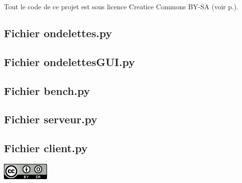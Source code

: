 \documentclass{article}
\begin{document}
Tout le code de ce projet est sous licence Creatice Commons BY-SA (voir p.\pageref{links}).


\subsection{Fichier ondelettes.py}


\subsection{Fichier ondelettesGUI.py}


\subsection{Fichier bench.py}


\subsection{Fichier serveur.py}


\subsection{Fichier client.py}


\begin{center}
\includegraphics{images/88x31.png}

\end{center}
\end{document}
